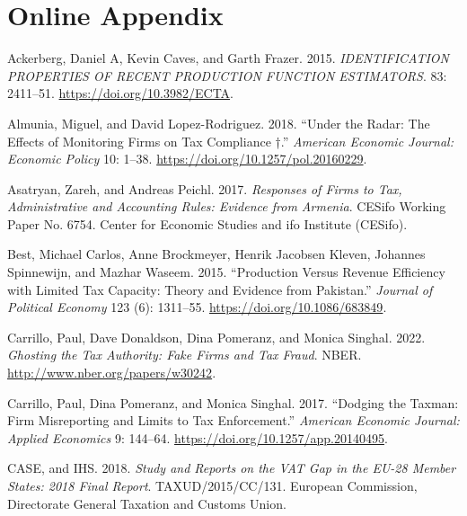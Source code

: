 \documentclass[
  12pt]{article}
\newlength{\cslhangindent}
\newenvironment{CSLReferences}[2] %
 {\begin{list}{}{%
  \setlength{\itemindent}{0pt}
  \setlength{\leftmargin}{0pt}
  \setlength{\parsep}{0pt}
  \ifodd #1
   \setlength{\leftmargin}{\cslhangindent}
   \setlength{\itemindent}{-1\cslhangindent}
  \fi
  \setlength{\itemsep}{#2\baselineskip}}}
 {\end{list}}
\begin{document}
\appendix

\section*{Online Appendix}\label{sec-online-appendix}

\protect{}\label{refs}
\begin{CSLReferences}{1}{1}
Ackerberg, Daniel A, Kevin Caves, and Garth Frazer. 2015.
\emph{IDENTIFICATION PROPERTIES OF RECENT PRODUCTION FUNCTION
ESTIMATORS}. 83: 2411--51. \url{https://doi.org/10.3982/ECTA}.

Almunia, Miguel, and David Lopez-Rodriguez. 2018. {``Under the Radar:
The Effects of Monitoring Firms on Tax Compliance †.''} \emph{American
Economic Journal: Economic Policy} 10: 1--38.
\url{https://doi.org/10.1257/pol.20160229}.

Asatryan, Zareh, and Andreas Peichl. 2017. \emph{Responses of Firms to
Tax, Administrative and Accounting Rules: Evidence from {Armenia}}.
CESifo Working Paper No. 6754. {Center for Economic Studies and ifo
Institute (CESifo)}.

Best, Michael Carlos, Anne Brockmeyer, Henrik Jacobsen Kleven, Johannes
Spinnewijn, and Mazhar Waseem. 2015. {``Production Versus Revenue
Efficiency with Limited Tax Capacity: Theory and Evidence from
{Pakistan}.''} \emph{Journal of Political Economy} 123 (6): 1311--55.
\url{https://doi.org/10.1086/683849}.

Carrillo, Paul, Dave Donaldson, Dina Pomeranz, and Monica Singhal. 2022.
\emph{Ghosting the Tax Authority: Fake Firms and Tax Fraud}. NBER.
\url{http://www.nber.org/papers/w30242}.

Carrillo, Paul, Dina Pomeranz, and Monica Singhal. 2017. {``Dodging the
Taxman: Firm Misreporting and Limits to Tax Enforcement.''}
\emph{American Economic Journal: Applied Economics} 9: 144--64.
\url{https://doi.org/10.1257/app.20140495}.

CASE, and IHS. 2018. \emph{Study and Reports on the {VAT} Gap in the
{EU}-28 Member States: 2018 Final Report}. TAXUD/2015/CC/131. {European
Commission, Directorate General Taxation and Customs Union}.


\end{CSLReferences}
\end{document}
